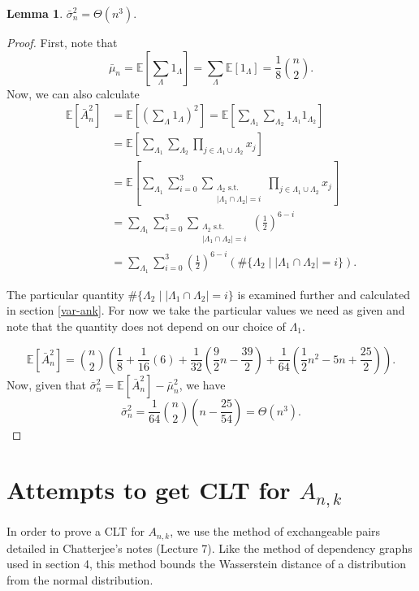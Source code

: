 \documentclass[12pt]{article} %
\newcommand{\p}[1]{\left(#1\right)}
\newcommand{\abs}[1]{\left\lvert#1\right\rvert}
\newcommand{\E}{\mathbb{E}}
\newtheorem{lem}[thm]{Lemma}
\theoremstyle{definition}
\theoremstyle{definition}
\begin{document}
\begin{lem}
\label{lem:var-an-cont}
$\bar{\sigma}_n^2 = \Theta(n^3).$
\end{lem}

\begin{proof}
First, note that 
$$\bar{\mu}_n = \E\left[\sum_{\Lambda} {1_\Lambda}\right] = \sum_{\Lambda} {\E[1_\Lambda]} = \frac{1}{8} \binom{n}{2}.$$
Now, we can also calculate
\begin{align*}
\E\left[ \bar{A}_n^2 \right] &= \E\left[\p{\sum_{\Lambda} {1_\Lambda}}^2\right] = \E\left[\sum_{\Lambda_1} {\sum_{\Lambda_2} {1_{\Lambda_1} 1_{\Lambda_2}}}\right] \\
&= \E\left[\sum_{\Lambda_1} {\sum_{\Lambda_2} {\prod_{j \in {\Lambda_1 \cup \Lambda_2}} {x_j}}}\right] \\
&= \E\left[\sum_{\Lambda_1} {\sum_{i=0}^{3} {\sum_{\substack{\Lambda_2 \textrm{ s.t. } \\ \abs{\Lambda_1 \cap \Lambda_2} = i}} {\prod_{j \in {\Lambda_1 \cup \Lambda_2}} {x_j}}}}\right] \\
&= \sum_{\Lambda_1} {\sum_{i=0}^{3} {\sum_{\substack{\Lambda_2 \textrm{ s.t. } \\ \abs{\Lambda_1 \cap \Lambda_2} = i}} {\p{\frac{1}{2}}^{6-i}}}} \\
&= \sum_{\Lambda_1} {\sum_{i=0}^{3} {\p{\frac{1}{2}}^{6-i} \p{\# \{\Lambda_2 \mid \abs{\Lambda_1 \cap \Lambda_2} = i \}}}}.
\end{align*}

The particular quantity $\# \{\Lambda_2 \mid \abs{\Lambda_1 \cap \Lambda_2} = i \}$ is examined further and calculated in section \ref{var-ank}. For now we take the particular values we need as given and note that the quantity does not depend on our choice of $\Lambda_1$.

$$
\E\left[ \bar{A}_n^2 \right] = \binom{n}{2} \p{\frac{1}{8} + \frac{1}{16}(6) + \frac{1}{32}\p{\frac{9}{2}n-\frac{39}{2}} + \frac{1}{64}\p{\frac{1}{2}n^2 - 5n + \frac{25}{2}}}.
$$
Now, given that $\bar{\sigma}_n^2 = \E\left[ \bar{A}_n^2 \right] - \bar{\mu}_n^2$, we have
$$ \bar{\sigma}_n^2 = \frac{1}{64}\binom{n}{2}\p{n - \frac{25}{54}} = \Theta(n^3). $$

\end{proof}

\section{Attempts to get CLT for $A_{n,k}$}

In order to prove a CLT for $A_{n,k}$, we use the method of exchangeable pairs detailed in Chatterjee's notes \cite{Chatterjee07} (Lecture 7). Like the method of dependency graphs used in section 4, this method bounds the Wasserstein distance of a distribution from the normal distribution. 
\end{document}
